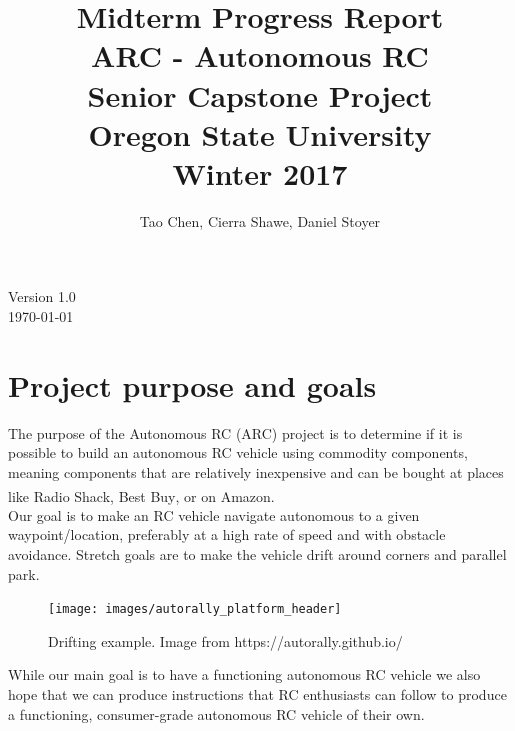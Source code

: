 \documentclass[compsoc,draftclsnofoot,onecolumn,10pt]{IEEEtran}
\date{}
\begin{document}
\begin{titlepage}
\title{
Midterm Progress Report\\
\LARGE
ARC - Autonomous RC\\
Senior Capstone Project\\
Oregon State University\\
Winter 2017
}
\author{Tao Chen, Cierra Shawe, Daniel Stoyer}
\maketitle
\begin{center}
	Version 1.0\\
	\today
\end{center}

\thispagestyle{empty} %
	
\end{titlepage}

\tableofcontents

\newpage

\section{Project purpose and goals} 
The purpose of the Autonomous RC (ARC) project is to determine if it is possible
to build an autonomous RC vehicle using commodity components, meaning components
that are relatively inexpensive and can be bought at places like Radio
Shack\textsuperscript{\textregistered}, Best Buy\textsuperscript{\textregistered}, or on Amazon. \\
Our goal is to make an RC vehicle navigate autonomous to a given
waypoint/location, preferably at a high rate of speed and with obstacle avoidance. Stretch goals are to
make the vehicle drift around corners and parallel park.\\

\begin{figure}[H]
   	\texttt{[image: images/autorally\_platform\_header]}
    \caption{Drifting example. Image from https://autorally.github.io/}
\end{figure}

While our main goal is to have a functioning autonomous RC vehicle we also hope
that we can produce instructions that RC enthusiasts can follow to produce a
functioning, consumer-grade autonomous RC vehicle of their own.
\end{document}

